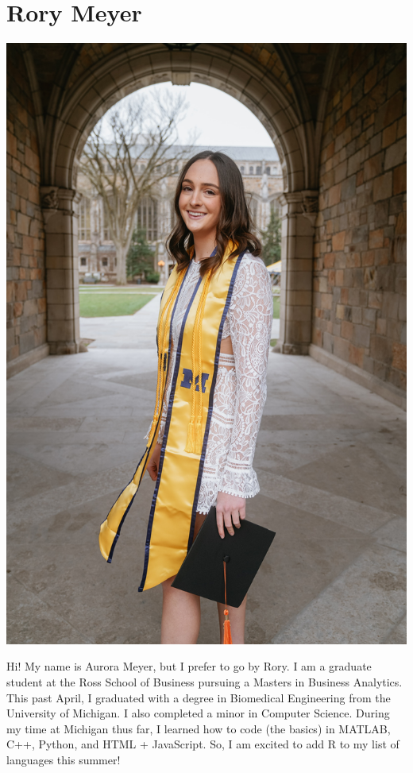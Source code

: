 \documentclass[
]{book}
\begin{document}
\hypertarget{rory-meyer}{%
\section{Rory Meyer}\label{rory-meyer}}

\includegraphics{gradphoto.jpg}

Hi! My name is Aurora Meyer, but I prefer to go by Rory. I am a graduate student at the Ross School of Business pursuing a Masters in Business Analytics. This past April, I graduated with a degree in Biomedical Engineering from the University of Michigan. I also completed a minor in Computer Science. During my time at Michigan thus far, I learned how to code (the basics) in MATLAB, C++, Python, and HTML + JavaScript. So, I am excited to add R to my list of languages this summer!
\end{document}
